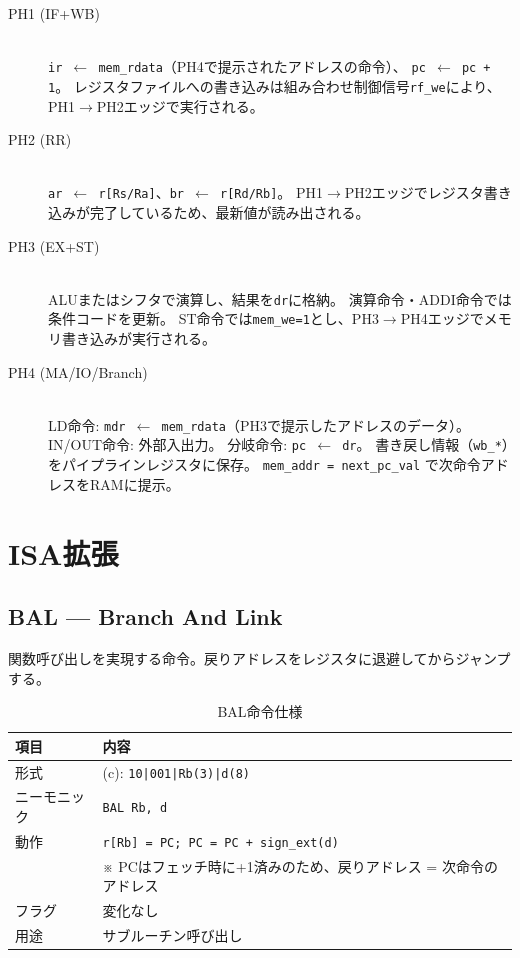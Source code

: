 \documentclass[a4paper,11pt]{ltjsarticle}
\begin{document}
\begin{description}
\item[PH1 (IF+WB)] \mbox{}\\
  \texttt{ir $\leftarrow$ mem\_rdata}（PH4で提示されたアドレスの命令）、
  \texttt{pc $\leftarrow$ pc + 1}。
  レジスタファイルへの書き込みは組み合わせ制御信号\texttt{rf\_we}により、
  PH1$\to$PH2エッジで実行される。

\item[PH2 (RR)] \mbox{}\\
  \texttt{ar $\leftarrow$ r[Rs/Ra]}、\texttt{br $\leftarrow$ r[Rd/Rb]}。
  PH1$\to$PH2エッジでレジスタ書き込みが完了しているため、最新値が読み出される。

\item[PH3 (EX+ST)] \mbox{}\\
  ALUまたはシフタで演算し、結果を\texttt{dr}に格納。
  演算命令・ADDI命令では条件コードを更新。
  ST命令では\texttt{mem\_we=1}とし、PH3$\to$PH4エッジでメモリ書き込みが実行される。

\item[PH4 (MA/IO/Branch)] \mbox{}\\
  LD命令: \texttt{mdr $\leftarrow$ mem\_rdata}（PH3で提示したアドレスのデータ）。
  IN/OUT命令: 外部入出力。
  分岐命令: \texttt{pc $\leftarrow$ dr}。
  書き戻し情報（\texttt{wb\_*}）をパイプラインレジスタに保存。
  \texttt{mem\_addr = next\_pc\_val} で次命令アドレスをRAMに提示。
\end{description}


\section{ISA拡張}

\subsection{BAL — Branch And Link}

関数呼び出しを実現する命令。戻りアドレスをレジスタに退避してからジャンプする。

\begin{table}[h]
\centering
\caption{BAL命令仕様}
\begin{tabular}{ll}
\toprule
項目 & 内容 \\
\midrule
形式       & (c): \texttt{10|001|Rb(3)|d(8)} \\
ニーモニック & \texttt{BAL Rb, d} \\
動作       & \texttt{r[Rb] = PC; PC = PC + sign\_ext(d)} \\
           & ※ PCはフェッチ時に+1済みのため、戻りアドレス = 次命令のアドレス \\
フラグ     & 変化なし \\
用途       & サブルーチン呼び出し \\
\bottomrule
\end{tabular}
\end{table}
\end{document}
